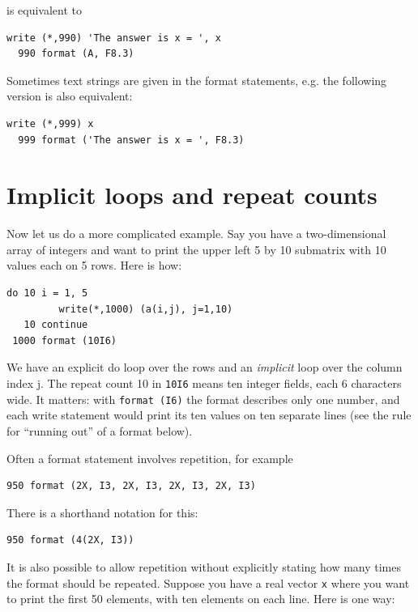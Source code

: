 is equivalent to

\begin{lstlisting}[style=fortran77] 
      write (*,990) 'The answer is x = ', x
  990 format (A, F8.3)
\end{lstlisting}

Sometimes text strings are given in the format statements, e.g. the following version is also equivalent:

\begin{lstlisting}[style=fortran77] 
      write (*,999) x
  999 format ('The answer is x = ', F8.3)
\end{lstlisting}

\section{Implicit loops and repeat counts}

Now let us do a more complicated example. Say you have a two-dimensional array of integers and want to print the upper left 5 by 10 submatrix with 10 values each on 5 rows. Here is how:

\begin{lstlisting}[style=fortran77]
      do 10 i = 1, 5
         write(*,1000) (a(i,j), j=1,10)
   10 continue
 1000 format (10I6)
\end{lstlisting}

We have an explicit do loop over the rows and an \emph{implicit} loop over the column index j. The repeat count 10 in \texttt{10I6} means ten integer fields, each 6 characters wide. It matters: with \texttt{format (I6)} the format describes only one number, and each write statement would print its ten values on ten separate lines (see the rule for ``running out'' of a format below).

Often a format statement involves repetition, for example

\begin{lstlisting}[style=fortran77]
  950 format (2X, I3, 2X, I3, 2X, I3, 2X, I3)
\end{lstlisting}

There is a shorthand notation for this:

\begin{lstlisting}[style=fortran77]
  950 format (4(2X, I3))
\end{lstlisting}

It is also possible to allow repetition without explicitly stating how many times the format should be repeated. Suppose you have a real vector \texttt{x} where you want to print the first 50 elements, with ten elements on each line. Here is one way:

